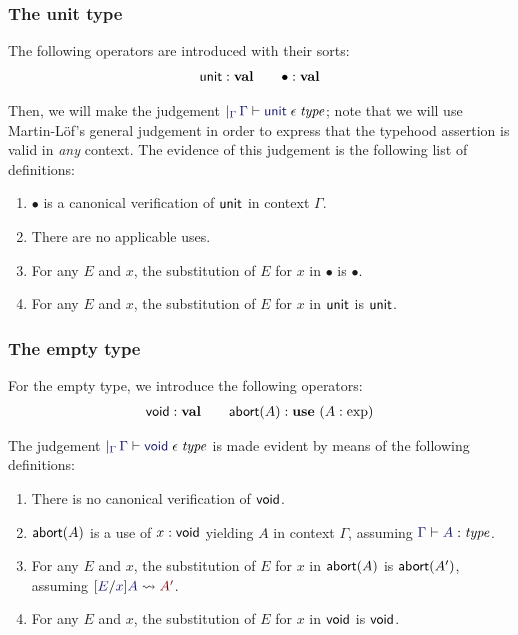 \documentclass[main.tex]{subfiles}
\begin{document}
\subsubsection{The unit type}

The following operators are introduced with their sorts:
\begin{gather*}
  \mathsf{unit} : \mathbf{val}\qquad \bullet : \mathbf{val}
\end{gather*}

Then, we will make the judgement
$\genj{\Gamma}{\lfsequent\Gamma\cantype\tyunit}$; note that we will use
Martin-L\"of's general judgement in order to express that the typehood
assertion is valid in \emph{any} context. The evidence of this
judgement is the following list of definitions:
\begin{enumerate}
  \item $\bullet$ is a canonical verification of $\mathsf{unit}$ in context $\Gamma$.
  \item There are no applicable uses.
  \item For any $E$ and $x$, the substitution of $E$ for $x$ in $\bullet$ is $\bullet$.
  \item For any $E$ and $x$, the substitution of $E$ for $x$ in $\mathsf{unit}$ is $\mathsf{unit}$.
\end{enumerate}

\subsubsection{The empty type}
For the empty type, we introduce the following operators:
\begin{gather*}
  \mathsf{void}:\mathbf{val} \qquad \mathsf{abort}(A):\mathbf{use}\ (A:\exp)
\end{gather*}

The judgement $\genj{\Gamma}{\lfsequent\Gamma\cantype\tyvoid}$ is made
evident by means of the following definitions:
\begin{enumerate}
  \item There is no canonical verification of $\mathsf{void}$.
  \item $\mathsf{abort}(A)$ is a use of $x:\mathsf{void}$ yielding $A$ in context $\Gamma$, assuming $\lfsequent\Gamma\type{A}$.
  \item For any $E$ and $x$, the substitution of $E$ for $x$ in $\mathsf{abort}(A)$ is $\mathsf{abort}(A')$, assuming $\hsubste{E}{x}{A}{A'}$.
  \item For any $E$ and $x$, the substitution of $E$ for $x$ in $\mathsf{void}$ is $\mathsf{void}$.
\end{enumerate}
\end{document}
